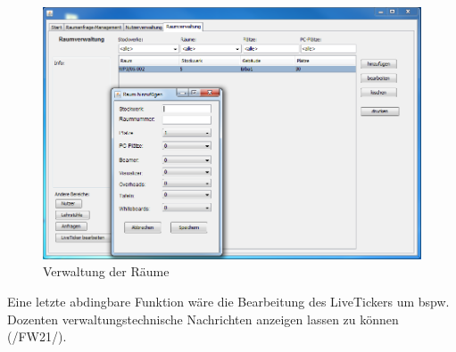 \begin{figure}[H]
\begin{center}
\includegraphics[width=170mm]{images/section_7/VerwaltungRaumverwaltung.PNG}
\caption{Verwaltung der Räume}
\label{img:RaumVerw}
\end{center}
\end{figure}
Eine letzte abdingbare Funktion wäre die Bearbeitung des LiveTickers um bspw. Dozenten verwaltungstechnische Nachrichten anzeigen lassen zu können (/FW21/).\\

